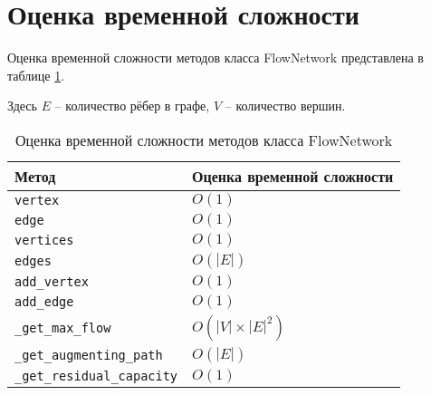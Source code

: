 \section{Оценка временной сложности}

Оценка временной сложности методов класса FlowNetwork
представлена в таблице \ref{tab:complexity}.

Здесь 
$ E $ -- количество рёбер в графе, 
$ V $ -- количество вершин.

\begin{table}[H]
    \centering
    \begin{tabular}{|l|l|}
        \hline
        Метод & Оценка временной сложности \\
        \hline
        \verb|vertex| & $ O(1) $ \\
        \hline
        \verb|edge| & $ O(1) $ \\
        \hline
        \verb|vertices| & $ O(1) $ \\
        \hline
        \verb|edges| & $ O(|E|) $ \\
        \hline
        \verb|add_vertex| & $ O(1) $ \\
        \hline
        \verb|add_edge| & $ O(1) $ \\
        \hline
        \verb|_get_max_flow| & $ O(|V| \times |E|^2) $ \\
        \hline
        \verb|_get_augmenting_path| & $ O(|E|) $ \\
        \hline
        \verb|_get_residual_capacity| & $ O(1) $ \\
        \hline
    \end{tabular}
    \caption{Оценка временной сложности методов класса FlowNetwork}
    \label{tab:complexity}
\end{table}